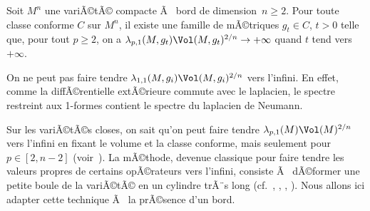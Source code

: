 \documentclass[11pt,a4paper]{smfart}
\begin{document}
\begin{theo}
Soit $M^n$ une variÃ©tÃ© compacte Ã  bord de dimension~$n\geq 2$. Pour toute
classe conforme $C$ sur $M^n$, il existe une famille de mÃ©triques $g_t\in C$,
$t>0$ telle que, pour tout $p\geq2$, on a 
$\lambda_{p,1}(M,g_t)\Vol(M,g_t)^{2/n}\to+\infty$ quand $t$ tend vers 
$+\infty$.
\end{theo}
\begin{rema}
On ne peut pas faire tendre $\lambda_{1,1}(M,g_i)\Vol(M,g_i)^{2/n}$ 
vers l'infini. En effet, comme la diffÃ©rentielle extÃ©rieure commute
avec le laplacien, le spectre restreint aux 1-formes contient le 
spectre du laplacien de Neumann.
\end{rema}
\begin{rema}
Sur les variÃ©tÃ©s closes, on sait qu'on peut faire tendre 
$\lambda_{p,1}(M)\Vol(M)^{2/n}$ vers l'infini en fixant le volume et 
la classe conforme, mais seulement pour $p\in[2,n-2]$ (voir~\cite{ces06}).
La mÃ©thode, devenue classique pour faire tendre les valeurs propres
de certains opÃ©rateurs vers l'infini, consiste Ã  dÃ©former une petite 
boule de la variÃ©tÃ© en un cylindre trÃ¨s long (cf.~\cite{gp95}, \cite{ab00},
 \cite{ces06}, \cite{aj11}). Nous allons ici
adapter cette technique Ã  la prÃ©sence d'un bord.
\end{rema}
\end{document}
